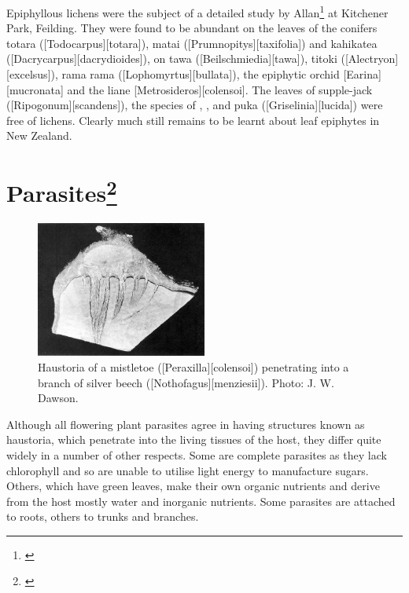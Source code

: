 Epiphyllous lichens were the subject of a detailed study by Allan\footnote{\cite{zahlbruckner1928epiphyllous}} at Kitchener Park, Feilding.
They were found to be abundant on the leaves of the conifers totara ([Todocarpus][totara]), matai ([Prumnopitys][taxifolia]) and kahikatea ([Dacrycarpus][dacrydioides]), on tawa ([Beilschmiedia][tawa]), titoki ([Alectryon][excelsus]), rama rama ([Lophomyrtus][bullata]), the epiphytic orchid [Earina][mucronata] and the liane [Metrosideros][colensoi].
The leaves of supple-jack ([Ripogonum][scandens]), the species of , ,  and puka ([Griselinia][lucida]) were free of lichens.
Clearly much still remains to be learnt about leaf epiphytes in New Zealand.

\section[Parasites]{Parasites\footnote{\cite{fineran1974parasitic}}}

\begin{figure}
	\includegraphics[width=0.5\textwidth]{graphics/figure57mistletoe-haustoria.jpg}
	\centering
	\caption[Haustoria of a mistletoe]{Haustoria of a mistletoe ([Peraxilla][colensoi]) penetrating into a branch of silver beech ([Nothofagus][menziesii]).
	Photo: J. W. Dawson.}%
	\label{fig:57mistletoe-haustori}
\end{figure}

Although all flowering plant parasites agree in having structures known as haustoria, which penetrate into the living tissues of the host, they differ quite widely in a number of other respects.
Some are complete parasites as they lack chlorophyll and so are unable to utilise light energy to manufacture sugars.
Others, which have green leaves, make their own organic nutrients and derive from the host mostly water and inorganic nutrients.
Some parasites are attached to roots, others to trunks and branches.

